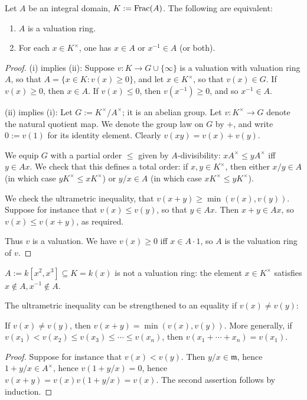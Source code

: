 \documentclass[reqno]{amsart}
\begin{document}
\begin{lemma}
  Let $A$ be an integral domain, $K := \operatorname{Frac}(A)$.
  The following are equivalent:
  \begin{enumerate}
  \item $A$ is a valuation ring.
  \item For each $x \in K^\times$,
    one has $x \in A$ or $x^{-1} \in A$ (or both).
  \end{enumerate}
\end{lemma}
\begin{proof}
  (i) implies (ii):
  Suppose $v : K \rightarrow G \cup \{\infty\}$ is a valuation
  with valuation ring $A$,
  so that $A = \{x \in K : v(x) \geq 0 \}$,
  and let $x \in K^\times$,
  so that $v(x) \in G$.
  If $v(x) \geq 0$, then $x \in A$.
  If $v(x) \leq 0$, then $v(x^{-1}) \geq 0$,
  and so $x^{-1} \in A$.

  (ii) implies (i):
  Let $G := K^\times / A^\times$;
  it is an abelian group.
  Let $v : K^\times \rightarrow G$
  denote the natural quotient map.
  We denote the group law on $G$ by $+$,
  and write $0 := v(1)$
  for its identity element.
  Clearly $v(x y) = v(x) + v(y)$.

  We equip $G$ with a partial order
  $\leq$ given by $A$-divisibility:
  $x A^\times  \leq y A^\times$ iff $y \in A x$.
  We check that this defines a total order:  if
  $x,y \in K^\times$, then either $x/y \in A$ (in which case
  $y K^\times \leq x K^\times$) or $y/x \in A$ (in which case
  $x K^\times \leq y K^\times$).

  We check the ultrametric inequality,
  that $v(x+y) \geq \min(v(x), v(y))$.
  Suppose for instance that $v(x) \leq v(y)$,
  so that $y \in A x$.
  Then $x + y \in A x$,
  so $v(x) \leq v(x+y)$, as required.

  Thus $v$ is a valuation.
  We have $v(x) \geq 0$ iff
  $x \in A \cdot 1$,
  so $A$ is the valuation ring of $v$.
\end{proof}

\begin{example}
  $A := k[x^2,x^3] \subseteq K = k(x)$ is not a valuation ring:
  the element $x \in K^\times$ satisfies
  $x \notin A, x^{-1} \notin A$.
\end{example}


The ultrametric inequality
can be strengthened to an equality
if \(v(x) \neq v(y)\):
\begin{lemma}
  If $v(x) \neq v(y)$,
  then $v(x+ y) = \min(v(x),v(y))$.
  More generally,
  if $v(x_1) < v(x_2) \leq v(x_3) \leq \dotsb \leq v(x_n)$,
  then $v(x_1 + \dotsb + x_n) = v(x_1)$.
\end{lemma}
\begin{proof}
  Suppose for instance that $v(x) < v(y)$.
  Then $y/x \in \mathfrak{m}$,
  hence $1 + y/x \in A^\times$,
  hence $v(1+y/x) = 0$,
  hence $v(x+y) = v(x) v(1+y/x) = v(x)$.
  The second assertion follows by induction.
\end{proof}
\end{document}
